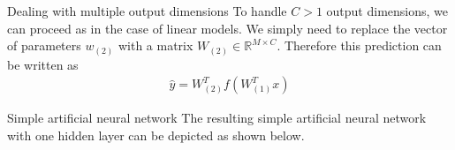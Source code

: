 \begin{parag}{Dealing with multiple output dimensions}
    To handle $C > 1$ output dimensions, we can proceed as in the case of linear models. We simply need to replace the vector of parameters $w_{\left(2\right)}$ with a matrix $W_{\left(2\right)} \in \mathbb{R}^{M \times C}$. Therefore this prediction can be written as 
	\begin{align*} 
		\hat{y} = W_{\left(2\right)}^{T}f\left(W_{\left(1\right)}^{T}x\right)
	\end{align*}
\end{parag}


\begin{parag}{Simple artificial neural network}
    The resulting simple artificial neural network with one hidden layer can be depicted as shown below.
\end{parag}

